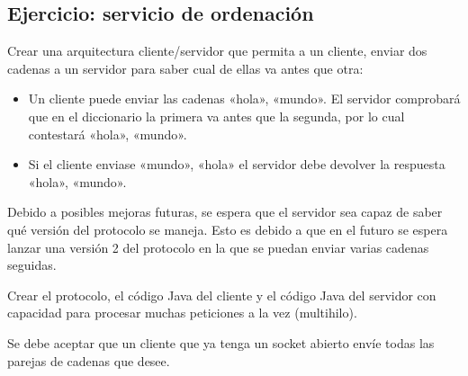 \documentclass[letterpaper,10pt,spanish]{sphinxmanual}
\begin{document}
\begin{sphinxVerbatim}[commandchars=\\\{\}]
                                   
                    
\end{sphinxVerbatim}


\subsection{Ejercicio: servicio de ordenación}
\label{\detokenize{textos/tema3:ejercicio-servicio-de-ordenacion}}
Crear una arquitectura cliente/servidor que permita a un cliente, enviar dos cadenas a un servidor para saber cual de ellas va antes que otra:
\begin{itemize}
\item {} 
Un cliente puede enviar las cadenas «hola», «mundo». El servidor comprobará que en el diccionario la primera va antes que la segunda, por lo cual contestará «hola», «mundo».

\item {} 
Si el cliente enviase «mundo», «hola» el servidor debe devolver la respuesta «hola», «mundo».

\end{itemize}

Debido a posibles mejoras futuras, se espera que el servidor sea capaz de saber qué versión del protocolo se maneja. Esto es debido a que en el futuro se espera lanzar una versión 2 del protocolo en la que se puedan enviar varias cadenas seguidas.

Crear el protocolo, el código Java del cliente y el código Java del servidor con capacidad para procesar muchas peticiones a la vez (multihilo).

Se debe aceptar que un cliente que ya tenga un socket abierto envíe todas las parejas de cadenas que desee.
\end{document}
